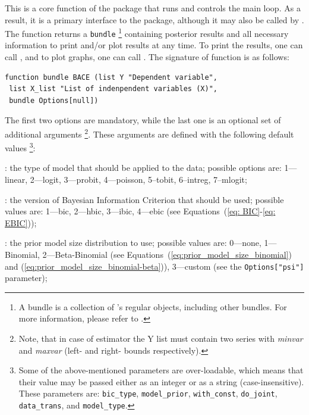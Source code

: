 \subsubsection{}\label{sec:BACE()}
This is a core function of the package that runs and
controls the main loop. As a result, it is a primary
interface to the  package, although it may
also be called by . The 
function returns a  \lstinline!bundle!%
\footnote{A  bundle is a collection of
	's regular objects, including other
	bundles. For more information, please refer to
	\cite{cottrell_luchcetti_gretl_manual}.} containing
posterior results and all necessary information to print
and/or plot results at any time. To print the results,
one can call , and to plot graphs,
one can call . The signature of 
function is as follows:
\begin{lstlisting}
function bundle BACE (list Y "Dependent variable",
 list X_list "List of indenpendent variables (X)",
 bundle Options[null])
\end{lstlisting}
The first two options are mandatory, while the last one
is an optional set of additional arguments%
\footnote{Note, that in case of  estimator
	the Y list must contain two series with \textit{minvar}
	and \textit{maxvar} (left- and right- bounds respectively).}.
These arguments are defined with the following default values%
	\label{sec:default_option_bundle}%
	\footnote{Some of the above-mentioned parameters are
		over-loadable, which means that their value may be
		passed either as an integer or as a string (case-insensitive).
		These parameters are:\label{sec:over-loadable_options}
		\texttt{bic\_type}, \texttt{model\_prior},
		\texttt{with\_const}, \texttt{do\_joint},
		\texttt{data\_trans}, and \texttt{model\_type}.}:

:
the type of model that should be applied to the data; possible options
are: 1---linear, 2---logit, 3---probit, 4---poisson,
5--tobit, 6--intreg, 7--mlogit;

: the version
of Bayesian Information Criterion that should be used;
possible values are: 1---bic, 2---hbic, 3---ibic,
4---ebic (see Equations~(\ref{eq: BIC}-\ref{eq: EBIC}));

: the prior model
size distribution to use; possible values are: 0---none,
1---Binomial, 2---Beta-Binomial
(see Equations~(\ref{eq:prior_model_size_binomial})
and (\ref{eq:prior_model_size_binomial-beta})), 3---custom
(see the \lstinline!Options["psi"]! parameter);

